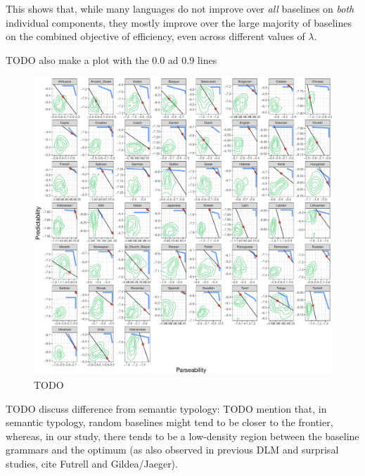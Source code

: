 \documentclass[10pt,twoside,lineno]{article}
\begin{document}
This shows that, while many languages do not improve over \emph{all} baselines on \emph{both} individual components, they mostly improve over the large majority of baselines on the combined objective of efficiency, even across different values of $\lambda$.

TODO also make a plot with the 0.0 ad 0.9 lines

\begin{figure}
\centering
\includegraphics[width=\textwidth]{../results/plane/analyze_pareto_optimality/pareto-plane-perLanguage-arrows-smoothed-halfspace-untransformed.pdf}
	\caption[]{TODO}\label{fig:lambda-halfplane-09}
\end{figure}

TODO discuss difference from semantic typology:
TODO mention that, in semantic typology, random baselines might tend to be closer to the frontier, whereas, in our study, there tends to be a low-density region between the baseline grammars and the optimum (as also observed in previous DLM and surprisal studies, cite Futrell and Gildea/Jaeger). 
\end{document}
